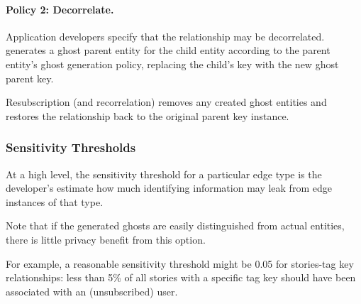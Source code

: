 \paragraph{Policy 2: Decorrelate.}
Application developers specify that the relationship may be decorrelated.
\sys{} generates a ghost parent entity for the child entity according to the parent entity's ghost
generation policy, replacing the child's key with the new ghost parent key.

Resubscription (and recorrelation) removes any created ghost entities and restores the relationship
back to the original parent key instance.


\subsubsection{Sensitivity Thresholds}
At a high level, the sensitivity threshold for a particular edge type is the developer's estimate
how much identifying information may leak from edge instances of that type.

Note that if the generated ghosts are easily distinguished from actual entities, there is
little privacy benefit from this option.

For example, a reasonable sensitivity threshold might be 0.05 for stories-tag key relationships:
less than 5\% of all stories with a specific tag key should have been associated with an
(unsubscribed) user. 


%


